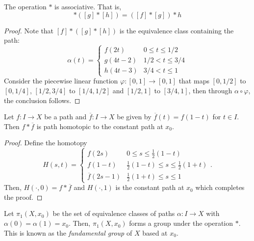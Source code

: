 \begin{proposition}
    The operation $*$ is associative. That is, 
    \begin{equation*}
        [f]*([g]*[h]) = ([f]*[g])*h
    \end{equation*}
\end{proposition}
\begin{proof}
    Note that $[f]*([g]*[h])$ is the equivalence class containing the path: 
    \begin{equation*}
        \alpha(t) = 
        \begin{cases}
            f(2t) & 0\le t\le 1/2\\
            g(4t - 2) & 1/2 < t\le 3/4\\
            h(4t - 3) & 3/4 < t\le 1
        \end{cases}
    \end{equation*}
    Consider the piecewise linear function $\varphi: [0,1]\to[0,1]$ that maps $[0,1/2]$ to $[0,1/4]$, $[1/2,3/4]$ to $[1/4,1/2]$ and $[1/2,1]$ to $[3/4,1]$, then through $\alpha\circ\varphi$, the conclusion follows.
\end{proof}

\begin{proposition}
    Let $f: I\to X$ be a path and $\overline f: I\to X$ be given by $\overline f(t) = f(1 - t)$ for $t\in I$. Then $f\ast\overline f$ is path homotopic to the constant path at $x_0$.
\end{proposition}
\begin{proof}
    Define the homotopy 
    \begin{equation*}
        H(s,t) = 
        \begin{cases}
            f(2s) & 0\le s\le\frac{1}{2}(1 - t)\\
            f(1 - t) & \frac{1}{2}(1 - t)\le s\le \frac{1}{2}(1 + t)\\
            \overline f(2s - 1) & \frac{1}{2}(1 + t)\le s\le 1
        \end{cases}.
    \end{equation*}
    Then, $H(\cdot, 0) = f\ast\overline f$ and $H(\cdot, 1)$ is the constant path at $x_0$ which completes the proof.
\end{proof}

\begin{definition}
    Let $\pi_1(X,x_0)$ be the set of equivalence classes of paths $\alpha: I\to X$ with $\alpha(0) = \alpha(1) = x_0$. Then, $\pi_1(X,x_0)$ forms a group under the operation $\ast$. This is known as the \emph{fundamental group} of $X$ based at $x_0$.
\end{definition}

